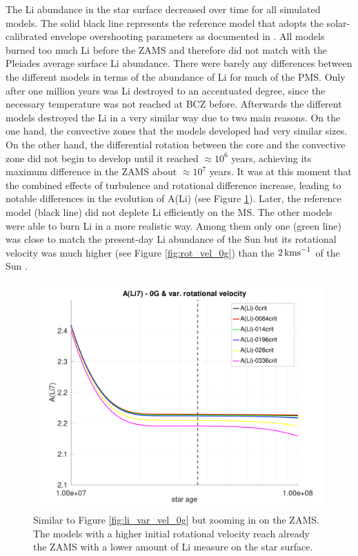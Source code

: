 \documentclass[fleqn,usenatbib]{mnras}
\begin{document}
The Li abundance in the star surface decreased over time for all simulated models. The solid black line represents the reference model that adopts the solar-calibrated envelope overshooting parameters as documented in \citet{Choi2016}. All models burned too much Li before the ZAMS and therefore did not match with the Pleiades average surface Li abundance. There were barely any differences between the different models in terms of the abundance of Li for much of the PMS. Only after one million years was Li destroyed to an accentuated degree, since the necessary temperature was not reached at BCZ before. Afterwards the different models destroyed the Li in a very similar way due to two main reasons. On the one hand, the convective zones that the models developed had very similar sizes. On the other hand, the differential rotation between the core and the convective zone did not begin to develop until it reached $ \approx 10^6$ years, achieving its maximum difference in the ZAMS about $ \approx 10^7$ years. It was at this moment that the combined effects of turbulence and rotational difference increase, leading to notable differences in the evolution of A(Li) (see Figure \ref{fig:li_var_vel_0g_z1}). Later, the reference model (black line) did not deplete Li efficiently on the MS. The other models were able to burn Li in a more realistic way. Among them only one (green line) was close to match the present-day Li abundance of the Sun but its rotational velocity was much higher (see Figure \ref{fig:rot_vel_0g}) than the $2\,\mathrm{kms}^{-1}$ of the Sun \citep{Gill2012}. \par

\begin{figure}
	\includegraphics[trim = 25mm 10mm 15mm 10mm clip,width=\columnwidth]{figures/paper1/li_var_vel_0_0g_z1.pdf}
    \caption {Similar to Figure \ref{fig:li_var_vel_0g} but zooming in on the ZAMS. The models with a higher initial rotational velocity reach already the ZAMS with a lower amount of Li measure on the star surface.}
    \label{fig:li_var_vel_0g_z1}
\end{figure}
\end{document}
